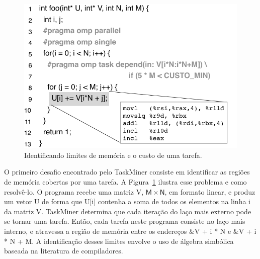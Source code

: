 \documentclass[sigplan,10pt]{acmart}
\newcommand\Taskminer{\mbox{\textsf{TaskMiner}}}
\begin{document}
\begin{figure}[b!]
\begin{center}
\includegraphics[width=1\columnwidth]{images/ex_Regions}
\caption{Identificando limites de memória e o custo de uma tarefa.}
\label{fig:ex_Regions}
\end{center}
\end{figure}

O primeiro desafio encontrado pelo \Taskminer{} consiste em 
identificar as regiões de memória cobertas por uma tarefa.
A Figura~\ref{fig:ex_Regions} ilustra esse problema e como resolvê-lo. O programa
recebe uma matriz \textsf{V}, $\mathsf{M}\times\mathsf{N}$, em formato linear,
e produz um vetor  \textsf{U} de forma que  \textsf{U[i]} contenha a soma de todos
os elementos na linha  \textsf{i} da matriz  \textsf{V}. {\Taskminer} determina que cada
iteração do laço mais externo pode se tornar uma tarefa. Então, cada tarefa neste programa
consiste no laço mais interno, e atravessa a região de memória entre os endereços  \textsf{\&V + i * N} e
 \textsf{\&V + i * N + M}. A identificação desses limites envolve o uso de álgebra simbólica baseada
 na literatura de compiladores.
 
\end{document}
